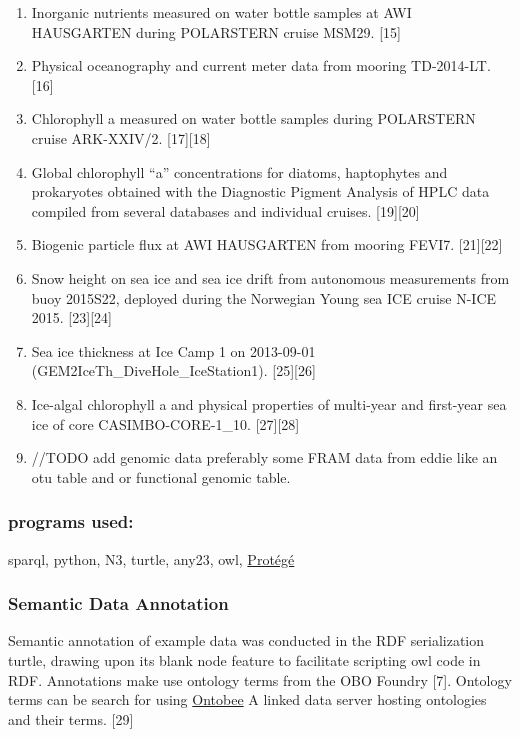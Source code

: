 \documentclass[]{article}
\begin{document}
\begin{enumerate}
\def\labelenumi{\arabic{enumi}.}
\item
  Inorganic nutrients measured on water bottle samples at AWI HAUSGARTEN
  during POLARSTERN cruise MSM29. {[}15{]}
\item
  Physical oceanography and current meter data from mooring TD-2014-LT.
  {[}16{]}
\item
  Chlorophyll a measured on water bottle samples during POLARSTERN
  cruise ARK-XXIV/2. {[}17{]}{[}18{]}
\item
  Global chlorophyll ``a'' concentrations for diatoms, haptophytes and
  prokaryotes obtained with the Diagnostic Pigment Analysis of HPLC data
  compiled from several databases and individual cruises.
  {[}19{]}{[}20{]}
\item
  Biogenic particle flux at AWI HAUSGARTEN from mooring FEVI7.
  {[}21{]}{[}22{]}
\item
  Snow height on sea ice and sea ice drift from autonomous measurements
  from buoy 2015S22, deployed during the Norwegian Young sea ICE cruise
  N-ICE 2015. {[}23{]}{[}24{]}
\item
  Sea ice thickness at Ice Camp 1 on 2013-09-01
  (GEM2IceTh\_DiveHole\_IceStation1). {[}25{]}{[}26{]}
\item
  Ice-algal chlorophyll a and physical properties of multi-year and
  first-year sea ice of core CASIMBO-CORE-1\_10. {[}27{]}{[}28{]}
\item
  //TODO add genomic data preferably some FRAM data from eddie like an
  otu table and or functional genomic table.
\end{enumerate}

\hypertarget{programs-used}{%
\subsubsection{programs used:}\label{programs-used}}

sparql, python, N3, turtle, any23, owl,
\href{https://protege.stanford.edu/}{Protégé}

\hypertarget{semantic-data-annotation}{%
\subsubsection{Semantic Data
Annotation}\label{semantic-data-annotation}}

Semantic annotation of example data was conducted in the RDF
serialization turtle, drawing upon its blank node feature to facilitate
scripting owl code in RDF. Annotations make use ontology terms from the
OBO Foundry {[}7{]}. Ontology terms can be search for using
\href{http://www.ontobee.org/}{Ontobee} A linked data server hosting
ontologies and their terms. {[}29{]}
\end{document}
